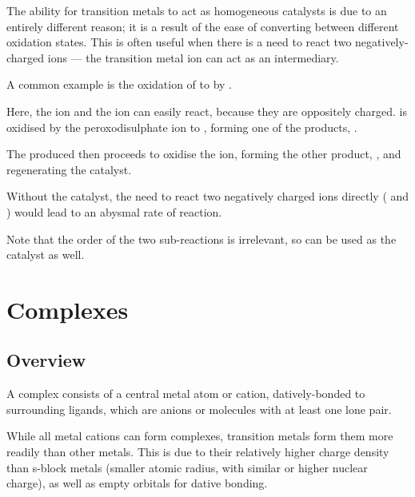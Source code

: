 				The ability for transition metals to act as homogeneous catalysts is due to an entirely different reason; it is a result
				of the ease of converting between different oxidation states. This is often useful when there is a need to react
				two negatively-charged ions --- the transition metal ion can act as an intermediary.

				A common example is the oxidation of  to  by .


				Here, the  ion and the  ion can easily react, because they are oppositely charged.  is
				oxidised by the peroxodisulphate ion to , forming one of the products, .

				The  produced then proceeds to oxidise the  ion, forming the other product, , and regenerating
				the  catalyst.

				Without the catalyst, the need to react two negatively charged ions directly ( and ) would lead to an
				abysmal rate of reaction.

				Note that the order of the two sub-reactions is irrelevant, so  can be used as the catalyst as well.







	\section{Complexes}

		\subsection{Overview}

			A complex consists of a central metal atom or cation, datively-bonded to surrounding ligands, which are anions or molecules with
			at least one lone pair.

			While all metal cations can form complexes, transition metals form them more readily than other metals. This is due to their
			relatively higher charge density than s-block metals (smaller atomic radius, with similar or higher nuclear charge), as well
			as empty orbitals for dative bonding.

